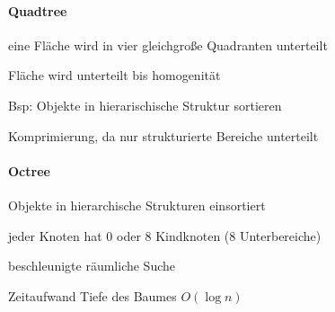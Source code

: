 \documentclass[landscape]{article}
\begin{document}
\begin{multicols}{3}
  \paragraph{Quadtree}
  \begin{itemize*}
    \item eine Fläche wird in vier gleichgroße Quadranten unterteilt
    \item Fläche wird unterteilt bis homogenität
    \item Bsp: Objekte in hierarischische Struktur sortieren
    \item Komprimierung, da nur strukturierte Bereiche unterteilt
  \end{itemize*}
  
  \paragraph{Octree}
  \begin{itemize*}
    \item Objekte in hierarchische Strukturen einsortiert
    \item jeder Knoten hat 0 oder 8 Kindknoten (8 Unterbereiche)
    \item beschleunigte räumliche Suche
    \item Zeitaufwand Tiefe des Baumes $O(\log n)$
  \end{itemize*}
  

\end{multicols}
\end{document}

